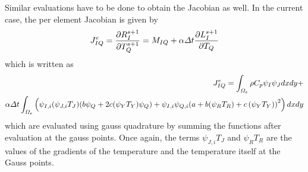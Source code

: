 \documentclass[preprint,12pt]{elsarticle}
\numberwithin{equation}{section}
\begin{document}
Similar evaluations have to be done to obtain the Jacobian as well. In the current case, the per element Jacobian is given by
\begin{equation}
	J^e_{IQ} = \frac{\partial R_I^{s+1}}{\partial T_{Q}^{s+1}} = M_{IQ} + \alpha \Delta t \frac{\partial L_I^{s+1}}{\partial T_Q}
\end{equation}
which is written as
\begin{eqnarray}
	J_{IQ}^e = \int_{\Omega_e}\rho C_p \psi_I  \psi_J  dx dy  + \\
	\alpha \Delta t \int_{\Omega_e} \left( \psi_{I,i} (\psi_{J,i}T_J)  (b\psi_Q + 2c  (\psi_Y T_Y) \psi_Q)   + \psi_{I,i}\psi_{Q,i}(a + b  (\psi_R T_R) + c \left( \psi_Y T_Y) \right)^2 \right)  dx dy 
\end{eqnarray}
which are evaluated using gauss quadrature by summing the functions after evaluation at the gauss points. Once again, the terms $\psi_{J,i}T_J$ and $\psi_R T_R$ are the values of the gradients of the temperature and the temperature itself at the Gauss points. 



%
%
\end{document}
